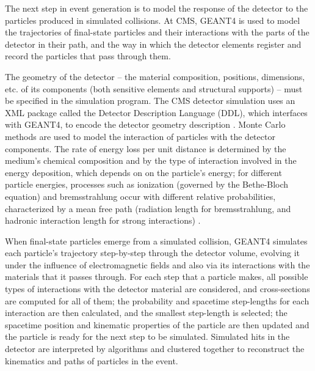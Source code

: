 The next step in event generation is to model the response of the detector to the particles produced in simulated collisions. At CMS, GEANT4 is used to model the trajectories of final-state particles and their interactions with the parts of the detector in their path, and the way in which the detector elements register and record the particles that pass through them.

The geometry of the detector -- the material composition, positions, dimensions, etc. of its components (both sensitive elements and structural supports) -- must be specified in the simulation program. The CMS detector simulation uses an XML package called the Detector Description Language (DDL), which interfaces with GEANT4, to encode the detector geometry description \cite{CMS_AN_2005-000}. Monte Carlo methods are used to model the interaction of particles with the detector components. The rate of energy loss per unit distance is determined by the medium's chemical composition and by the type of interaction involved in the energy deposition, which depends on on the particle's energy; for different particle energies, processes such as ionization (governed by the Bethe-Bloch equation) and bremsstrahlung occur with different relative probabilities, characterized by a mean free path (radiation length for bremsstrahlung, and hadronic interaction length for strong interactions) \cite{Tavernier:1172614}.

When final-state particles emerge from a simulated collision, GEANT4 simulates each particle's trajectory step-by-step through the detector volume, evolving it under the influence of electromagnetic fields and also via its interactions with the materials that it passes through. For each step that a particle makes, all possible types of interactions with the detector material are considered, and cross-sections are computed for all of them; the probability and spacetime step-lengths for each interaction are then calculated, and the smallest step-length is selected; the spacetime position and kinematic properties of the particle are then updated and the particle is ready for the next step to be simulated. Simulated hits in the detector are interpreted by algorithms and clustered together to reconstruct the kinematics and paths of particles in the event.

